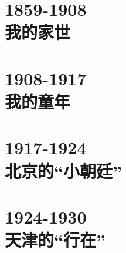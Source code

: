 \documentclass[oneside,openright,headings=optiontohead]{scrbook}
\begin{document}
\begin{figure}[ht]
	\begin{center}
		
	\end{center}
\end{figure}
\newpage
{\color{TEXTColor}
\begin{multicols}{2}
\tableofcontents
\end{multicols}
\thispagestyle{empty}
\newpage
\part{1859-1908\\\hspace{1cm}我的家世}
\begin{multicols}{2}





\end{multicols}
\part{1908-1917\\\hspace{1cm}我的童年}
\begin{multicols}{2}






\end{multicols}
\part{1917-1924\\\hspace{1cm}北京的“小朝廷”}
\begin{multicols}{2}













\end{multicols}
\part{1924-1930\\\hspace{1cm}天津的“行在”}
\begin{multicols}{2}







\end{multicols}
}
\end{document}
